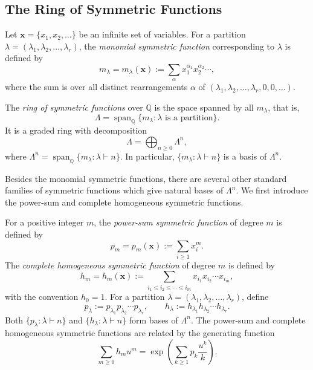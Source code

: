 \documentclass[12pt]{article}
\theoremstyle{definition}
\newcommand{\1}{\mathbf 1}
\begin{document}

\subsection{The Ring of Symmetric Functions}



Let $\mathbf{x}=\{x_1,x_2,\ldots\}$ be an infinite set of variables. For a
partition $\lambda=(\lambda_1,\lambda_2,\ldots,\lambda_r)$, the
\emph{monomial symmetric function} corresponding to $\lambda$ is defined by
$$
m_\lambda=m_\lambda(\mathbf{x})
:=
\sum_{\alpha}x_1^{\alpha_1}x_2^{\alpha_2}\cdots,
$$ where the sum is over all distinct rearrangements $\alpha$ of
$(\lambda_1,\lambda_2,\ldots,\lambda_r,0,0,\ldots)$.

The \emph{ring of symmetric functions} over $\mathbb{Q}$ is the space spanned by all $m_\lambda$, that is, 
$$
\Lambda
=
\operatorname{span}_{\mathbb{Q}}
\{m_\lambda:\lambda \text{ is a partition}\}.
$$
It is a graded ring with decomposition
$$
\Lambda
=
\bigoplus_{n\geq 0}\Lambda^n,
$$
where $\Lambda^n=\operatorname{span}_{\mathbb{Q}}
\{m_\lambda:\lambda\vdash n\}.
$ In particular, $\{m_\lambda:\lambda\vdash n\}$ is a basis of
$\Lambda^n$.

Besides the monomial symmetric functions, there are several other standard
families of symmetric functions which give natural bases of $\Lambda^n$.
We first introduce the power-sum and complete homogeneous symmetric
functions.

For a positive integer $m$, the \emph{power-sum symmetric function} of
degree $m$ is defined by
$$
p_m=p_m(\mathbf{x})
:=
\sum_{i\geq 1}x_i^m.
$$
The \emph{complete homogeneous symmetric function} of degree $m$ is defined
by
$$
h_m=h_m(\mathbf{x})
:=
\sum_{i_1\leq i_2\leq\cdots\leq i_m}
x_{i_1}x_{i_2}\cdots x_{i_m},
$$
with the convention $h_0=1$. For a partition
$\lambda=(\lambda_1,\lambda_2,\ldots,\lambda_r)$, define
$$
p_\lambda
:=
p_{\lambda_1}p_{\lambda_2}\cdots p_{\lambda_r},
\qquad
h_\lambda
:=
h_{\lambda_1}h_{\lambda_2}\cdots h_{\lambda_r}.
$$
Both $\{p_\lambda:\lambda\vdash n\}$ and $\{h_\lambda:\lambda\vdash n\}
$ form bases of $\Lambda^n$. The power-sum and complete homogeneous symmetric functions are related by the generating function
\begin{equation*}
    \sum_{m\geq 0}h_mu^m
=
\exp\left(
\sum_{k\geq 1}p_k\frac{u^k}{k}
\right).
\end{equation*}
\end{document}
